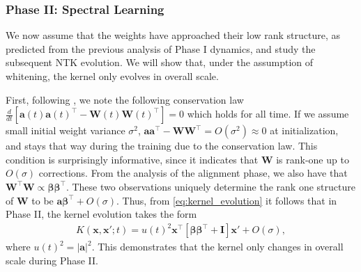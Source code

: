 \documentclass{article} %
\def\x{\bm x}
\begin{document}







\subsubsection{Phase II: Spectral Learning}

We now assume that the weights have approached their low rank structure, as predicted from the previous analysis of Phase I dynamics, and study the subsequent NTK evolution. We will show that, under the assumption of whitening, the kernel only evolves in overall scale.

First, following \citep{fukumizu1998effect, arora_cohen_linear_acc,Du2018AlgorithmicRI}, we note the following conservation law $\frac{d}{dt} \left[ \bm a(t) \bm a(t)^\top - \bm W(t) \bm W(t)^\top \right] = 0$ which holds for all time. If we assume small initial weight variance $\sigma^2$, $\bm a \bm a^\top - \bm W \bm  W^\top = O(\sigma^2) \approx 0$ at initialization, and stays that way during the training due to the conservation law. This condition is surprisingly informative, since it indicates that $\bm W$ is rank-one up to $O(\sigma)$ corrections. From the analysis of the alignment phase, we also have that $\bm W^\top \bm W \propto \bm \beta \bm \beta^\top$. These two observations uniquely determine the rank one structure of $\bm W$ to be $\bm a \bm \beta^\top+O(\sigma)$. Thus, from \eqref{eq:kernel_evolution} it follows that in Phase II, the kernel evolution takes the form 
\begin{align}
    K(\x,\x';t) = u(t)^2 \x^\top  \left[ \bm\beta \bm\beta^\top + \bm I \right] \x' + O(\sigma),
\end{align}
where $u(t)^2 = |\bm a|^2$. This demonstrates that the kernel only changes in overall scale during Phase II. 
\end{document}

